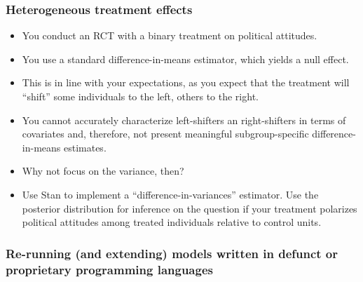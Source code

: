 \documentclass[
  11pt,
]{article}
\providecommand{\tightlist}{%
  \setlength{\itemsep}{0pt}\setlength{\parskip}{0pt}}
\begin{document}
\hypertarget{heterogeneous-treatment-effects}{%
\subsubsection{Heterogeneous treatment effects}\label{heterogeneous-treatment-effects}}

\begin{itemize}
\tightlist
\item
  You conduct an RCT with a binary treatment on political attitudes.
\item
  You use a standard difference-in-means estimator, which yields a null effect.
\item
  This is in line with your expectations, as you expect that the treatment will ``shift'' some individuals to the left, others to the right.
\item
  You cannot accurately characterize left-shifters an right-shifters in terms of covariates and, therefore, not present meaningful subgroup-specific difference-in-means estimates.
\item
  Why not focus on the variance, then?
\item
  Use Stan to implement a ``difference-in-variances'' estimator. Use the posterior distribution for inference on the question if your treatment polarizes political attitudes among treated individuals relative to control units.
\end{itemize}

\hypertarget{re-running-and-extending-models-written-in-defunct-or-proprietary-programming-languages}{%
\subsubsection{Re-running (and extending) models written in defunct or proprietary programming languages}\label{re-running-and-extending-models-written-in-defunct-or-proprietary-programming-languages}}
\end{document}
